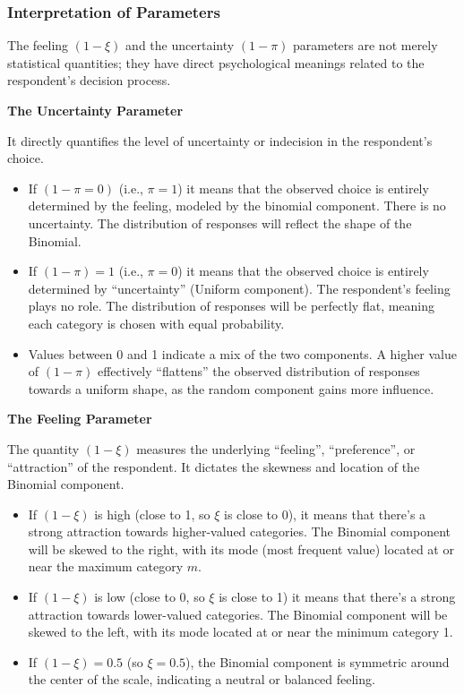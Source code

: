 \documentclass[
  letterpaper,
  DIV=11,
  numbers=noendperiod]{scrartcl}
\begin{document}
\hypertarget{interpretation-of-parameters}{%
\subsubsection{Interpretation of
Parameters}\label{interpretation-of-parameters}}

The feeling \((1-\xi)\) and the uncertainty \((1-\pi)\) parameters are
not merely statistical quantities; they have direct psychological
meanings related to the respondent's decision process.

\textbf{The Uncertainty Parameter}

It directly quantifies the level of uncertainty or indecision in the
respondent's choice.

\begin{itemize}
\item
  If \((1-\pi = 0)\) (i.e., \(\pi = 1\)) it means that the observed
  choice is entirely determined by the feeling, modeled by the binomial
  component. There is no uncertainty. The distribution of responses will
  reflect the shape of the Binomial.
\item
  If \((1−\pi)=1\) (i.e., \(\pi=0\)) it means that the observed choice
  is entirely determined by ``uncertainty'' (Uniform component). The
  respondent's feeling plays no role. The distribution of responses will
  be perfectly flat, meaning each category is chosen with equal
  probability.
\item
  Values between 0 and 1 indicate a mix of the two components. A higher
  value of \((1−\pi)\) effectively ``flattens'' the observed
  distribution of responses towards a uniform shape, as the random
  component gains more influence.
\end{itemize}

\textbf{The Feeling Parameter}

The quantity \((1−\xi)\) measures the underlying ``feeling'',
``preference'', or ``attraction'' of the respondent. It dictates the
skewness and location of the Binomial component.

\begin{itemize}
\item
  If \((1−\xi)\) is high (close to 1, so \(\xi\) is close to 0), it
  means that there's a strong attraction towards higher-valued
  categories. The Binomial component will be skewed to the right, with
  its mode (most frequent value) located at or near the maximum category
  \(m\).
\item
  If \((1−\xi)\) is low (close to 0, so \(\xi\) is close to 1) it means
  that there's a strong attraction towards lower-valued categories. The
  Binomial component will be skewed to the left, with its mode located
  at or near the minimum category 1.
\item
  If \((1−\xi)=0.5\) (so \(\xi=0.5\)), the Binomial component is
  symmetric around the center of the scale, indicating a neutral or
  balanced feeling.
\end{itemize}
\end{document}
